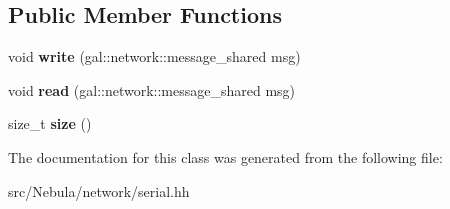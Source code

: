 \subsection*{Public Member Functions}
\begin{DoxyCompactItemize}
\item 
\hypertarget{classgal_1_1network_1_1serial_ab4049343e023fb2e57e8bc4fee306300}{void {\bfseries write} (gal\-::network\-::message\-\_\-shared msg)}\label{classgal_1_1network_1_1serial_ab4049343e023fb2e57e8bc4fee306300}

\item 
\hypertarget{classgal_1_1network_1_1serial_a9b2c7927aff4750ab8be49f7849aa736}{void {\bfseries read} (gal\-::network\-::message\-\_\-shared msg)}\label{classgal_1_1network_1_1serial_a9b2c7927aff4750ab8be49f7849aa736}

\item 
\hypertarget{classgal_1_1network_1_1serial_a933ac0cf62f984b824549498c99c4cc1}{size\-\_\-t {\bfseries size} ()}\label{classgal_1_1network_1_1serial_a933ac0cf62f984b824549498c99c4cc1}

\end{DoxyCompactItemize}


The documentation for this class was generated from the following file\-:\begin{DoxyCompactItemize}
\item 
src/\-Nebula/network/serial.\-hh\end{DoxyCompactItemize}
